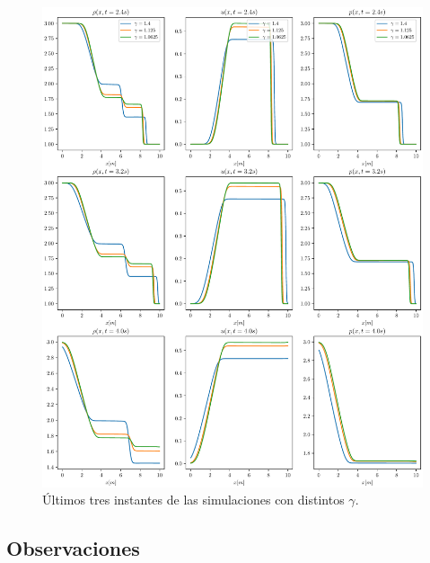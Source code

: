 \begin{figure}[H]
	\includegraphics[width=\linewidth]{../euler1D/experimentos/graficas_sod/2.pdf}
	\caption{Últimos tres instantes de las simulaciones con distintos $\gamma$.}
\end{figure}

\subsection{Observaciones}